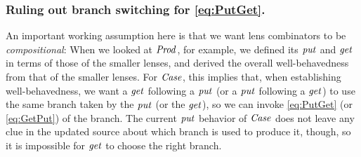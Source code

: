 \subsubsection{Ruling out branch switching for \ref{eq:PutGet}.} An important working assumption here is that we want lens combinators to be \emph{compositional}:
When we looked at \ensuremath{\Conid{Prod}}, for example, we defined its \ensuremath{\Varid{put}} and \ensuremath{\Varid{get}} in terms of those of the smaller lenses, and derived the overall well-behavedness from that of the smaller lenses.
For \ensuremath{\Conid{Case}}, this implies that, when establishing well-behavedness, we want a \ensuremath{\Varid{get}} following a \ensuremath{\Varid{put}} (or a \ensuremath{\Varid{put}} following a \ensuremath{\Varid{get}}) to use the same branch taken by the \ensuremath{\Varid{put}} (or the \ensuremath{\Varid{get}}), so we can invoke \ref{eq:PutGet} (or \ref{eq:GetPut}) of the branch.
The current \ensuremath{\Varid{put}} behavior of \ensuremath{\Conid{Case}} does not leave any clue in the updated source about which branch is used to produce it, though, so it is impossible for \ensuremath{\Varid{get}} to choose the right branch.

